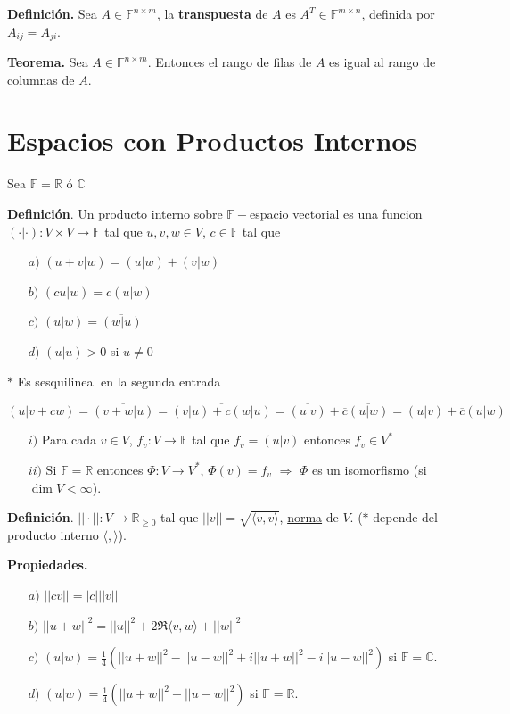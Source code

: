 \newpage

\textbf{Definición.} Sea $A\in \mathbb{F}^{n \times m}$,
la \textbf{transpuesta} de $A$ es $A^{T}\in \mathbb{F}^{m \times n}$,
definida por $A_{ij} = A_{ji}$.

\textbf{Teorema.} Sea $A\in \mathbb{F}^{n \times m}$. Entonces
el rango de filas de $A$ es igual al rango de columnas de $A$.

\section{{\Large Espacios con Productos Internos}}

Sea $\mathbb{F}=\mathbb{R}$ ó $\mathbb{C}$

\textbf{Definición}. Un producto interno sobre $\mathbb{F}-$espacio vectorial
es una funcion $(\cdot|\cdot):V\times V \to \mathbb{F}$ tal que $u, v, w \in V$,
$c\in\mathbb{F}$ tal que

\begin{itemize}
    \item[$a)$] $(u+v|w)=(u|w)+(v|w)$
    \item[$b)$] $(cu|w)=c(u|w)$
    \item[$c)$] $(u|w)=\overline{(w|u)}$
    \item[$d)$] $(u|u) > 0$ si $u \not = 0$
\end{itemize}

$\ast$ Es sesquilineal en la segunda entrada

$(u|v+cw) = \overline{(v+w|u)}
          = \overline{(v|u)+c(w|u)}
          = \overline{(u|v)}+\overline{c}\overline{(u|w)}
          = (u|v)+\overline{c}(u|w)$

\begin{itemize}
    \item[$i)$] Para cada $v \in V$, $f_{v}:V \to \mathbb{F}$ tal
    que $f_{v}=(u|v)$ entonces $f_{v}\in V^{\ast}$
    \item[$ii)$] Si $\mathbb{F}=\mathbb{R}$ entonces $\Phi:V
    \to V^{\ast}$, $\Phi(v)=f_{v}$ $\Rightarrow$
    $\Phi$ es un isomorfismo (si $\dim V < \infty$).
\end{itemize}

\textbf{Definición}. $||\cdot||:V \to\mathbb{R}_ {\geq 0}$
tal que $||v||=\sqrt{\langle v,v\rangle}$, \underline{norma} de $V$.
($\ast$ depende del producto interno $\langle , \rangle$).

\textbf{Propiedades.}

\begin{itemize}
    \item[$a)$] $||cv||=|c|||v||$
    \item[$b)$] $||u+w||^{2}=||u||^{2}+2\Re\langle v, w\rangle+||w||^{2}$
    \item[$c)$] $(u|w)=\frac{1}{4}\left(||u+w||^{2}
                                          -||u-w||^{2}
                                          +i||u+w||^{2}
                                          -i||u-w||^{2}\right)$ si $\mathbb{F}=\mathbb{C}$.
    \item[$d)$] $(u|w)=\frac{1}{4}\left(||u+w||^{2}
                                        -||u-w||^{2}\right)$ si $\mathbb{F}=\mathbb{R}$.
\end{itemize}

